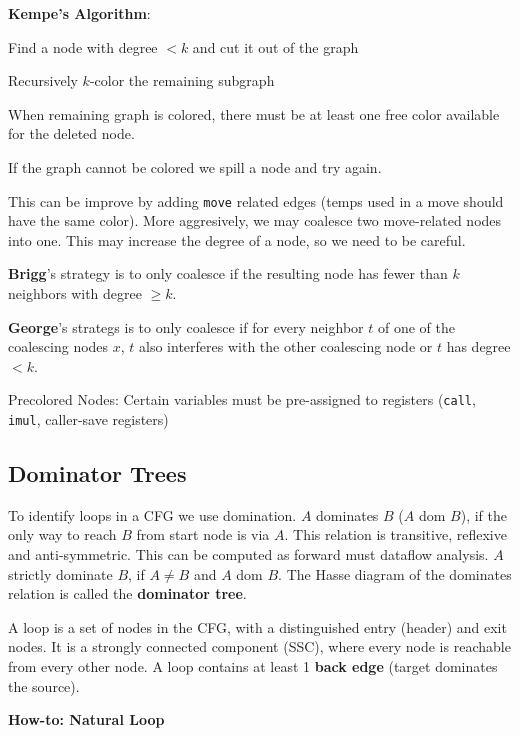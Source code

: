\textbf{Kempe's Algorithm}:
\begin{compactitem}[$\quad\bullet$]
	\item Find a node with degree $< k$ and cut it out of the graph
	\item Recursively $k$-color the remaining subgraph
	\item When remaining graph is colored, there must be at least one free color available for the deleted node.
	\item If the graph cannot be colored we spill a node and try again.
\end{compactitem}\medskip

This can be improve by adding \texttt{move} related edges (temps used in a move should have the same color). More aggresively, we may coalesce two move-related nodes into one. This may increase the degree of a node, so we need to be careful. \medskip

\textbf{Brigg}'s strategy is to only coalesce if the resulting node has fewer than $k$ neighbors with degree $\geq k$. \medskip

\textbf{George}'s strategs is to only coalesce if for every neighbor $t$ of one of the coalescing nodes $x$, $t$ also interferes with the other coalescing node or $t$ has degree $< k$.\medskip

Precolored Nodes: Certain variables must be pre-assigned to registers (\texttt{call}, \texttt{imul}, caller-save registers)



\subsection*{Dominator Trees}

To identify loops in a CFG we use domination. $A$ dominates $B$ ($A$ dom $B$), if the only way to reach $B$ from start node is via $A$. This relation is transitive, reflexive and anti-symmetric. This can be computed as forward must dataflow analysis. $A$ strictly dominate $B$, if $A \neq B$ and $A$ dom $B$. The Hasse diagram of the dominates relation is called the \textbf{dominator tree}.\medskip

A loop is a set of nodes in the CFG, with a distinguished entry (header) and exit nodes. It is a strongly connected component (SSC), where every node is reachable from every other node. A loop contains at least 1 \textbf{back edge} (target dominates the source).\medskip

\textbf{How-to: Natural Loop}

